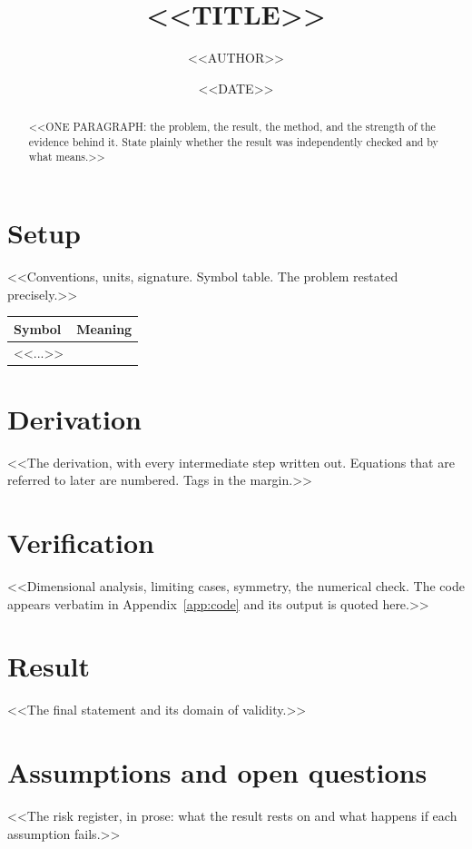 \documentclass[11pt,a4paper]{article}
\title{<<TITLE>>}
\author{<<AUTHOR>>}
\date{<<DATE>>}
\begin{document}
\maketitle


\begin{abstract}
<<ONE PARAGRAPH: the problem, the result, the method, and the strength of the
evidence behind it. State plainly whether the result was independently checked
and by what means.>>
\end{abstract}

\tableofcontents

\section{Setup}
<<Conventions, units, signature. Symbol table. The problem restated precisely.>>

\begin{longtable}{ll}
\toprule
Symbol & Meaning \\
\midrule
<<...>> \\
\bottomrule
\end{longtable}

\section{Derivation}
<<The derivation, with every intermediate step written out. Equations that are
referred to later are numbered. Tags in the margin.>>

\section{Verification}
<<Dimensional analysis, limiting cases, symmetry, the numerical check. The code
appears verbatim in Appendix~\ref{app:code} and its output is quoted here.>>

\section{Result}
<<The final statement and its domain of validity.>>

\section{Assumptions and open questions}
<<The risk register, in prose: what the result rests on and what happens if each
assumption fails.>>
\end{document}
